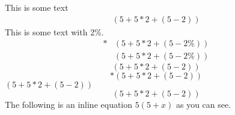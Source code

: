 This is some text
\begin{align}\label{equ1(good)}%
(5+5*2+(5-2))%
\end{align}
This is some text with 2\%.
\begin{align}*
&(5+5*2+(5-2\%))\\
&\left(5+5*2+\left(5-2\%\right)\right)
\end{align}
\begin{equation}\label{equ2(good)}
(5+5*2+(5-2))%
\end{equation}
\begin{equation}*
(5+5*2+(5-2))
\end{equation}
\((5+5*2+(5-2))\)
\[(5+5*2+(5-2))\]
The following is an inline equation $5(5+x)$ as you can see.
